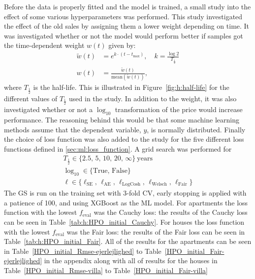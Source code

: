 \documentclass[a4paper, twoside, nobib]{tufte-book}
\newcommand{\autocite}[1]{\citep{#1}}
\begin{document}
Before the data is properly fitted and the model is trained, a small study into the effect of some various hyperparameters was performed. This study investigated the effect of the old sales by assigning them a lower weight depending on time. It was investigated whether or not the model would perform better if samples got the time-dependent weight $w(t)$ given by:
\begin{equation}
  \begin{split}
    \tilde{w}(t) &= e^{ k \cdot (t-t_\mathrm{max}) }, \quad k = \frac{\log 2}{T_{\frac{1}{2}}} \\
    w(t) &= \frac{\tilde{w}(t)}{\mathrm{mean}(\tilde{w}(t))},
  \end{split}
\end{equation}
where $T_{\frac{1}{2}}$ is the half-life. This is illustrated in Figure~\ref{fig:h:half-life} for the different values of $T_{\frac{1}{2}}$ used in the study.  In addition to the weight, it was also investigated whether or not a $\log_{10}$ transformation of the price would increase performance. The reasoning behind this would be that some machine learning methods assume that the dependent variable, $y$, is normally distributed. Finally the choice of loss function was also added to the study for the five different loss functions defined in \autoref{sec:ml:loss_function}. A grid search was performed for 
\begin{equation}
  \begin{split}
    T_{\frac{1}{2}} \in \{2.5,\, 5,\, 10,\, 20,\, \infty \}~\mathrm{ years} \\
    \log_{10} \in \{\mathrm{True},\, \mathrm{False} \} \\
    \ell \in \{ \ell_\mathrm{SE},\, \ell_\mathrm{AE},\, \ell_\mathrm{LogCosh},\, \ell_\mathrm{Welsch},\, \ell_\mathrm{Fair} \}
  \end{split}
\end{equation}
The GS is run on the training set with \num{3}-fold CV, early stopping is applied with a patience of \num{100}, and using XGBoost \autocite{chenXGBoostScalableTree2016} as the ML model. For apartments the loss function with the lowest $f_\mathrm{eval}$ was the Cauchy loss: the results of the Cauchy loss can be seen in Table~\ref{tab:h:HPO_initial_Cauchy}. For houses the loss function with the lowest $f_\mathrm{eval}$ was the Fair loss: the results of the Fair loss can be seen in Table~\ref{tab:h:HPO_initial_Fair}. All of the results for the apartments can be seen in Table~\ref{HPO_initial_Rmse-ejerlejlighed} to Table~\ref{HPO_initial_Fair-ejerlejlighed} in the appendix along with all of results for the houses in Table~\ref{HPO_initial_Rmse-villa} to Table~\ref{HPO_initial_Fair-villa}
\end{document}
